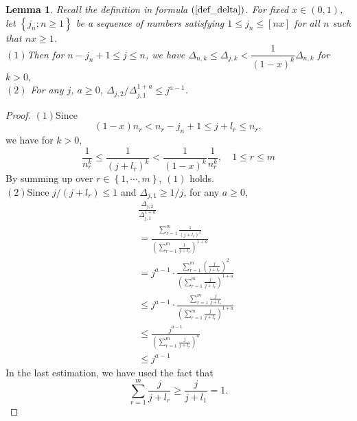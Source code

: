 \documentclass[12pt]{article}
\theoremstyle{plain}
\newtheorem{lem}{\textbf{Lemma}}
\theoremstyle{definition}
\theoremstyle{remark}
\begin{document}
\begin{lem}
	Recall the definition in formula $(\ref{def_delta})$. For fixed $x\in (0,1)$, let $\left\{j_{n} ; n \geq 1\right\}$ be a sequence of numbers satisfying $1\leq j_n\leq [nx]$ for all $n$ such that $nx\geq 1$. \\
	$(1)$Then for $n-j_n +1\leq j \leq n$, we have $\Delta_{n, k} \leq \Delta_{j, k}<\dfrac{1}{(1-x)^{k}} \Delta_{n, k}$ for $k>0$,\\
	$(2)$ For any $j$, $a\geq 0$, $\Delta_{j, 2} / \Delta_{j, 1}^{1+a} \leq j^{a-1}$.
\end{lem}
\begin{proof}
	$(1)$Since 
	\begin{equation*}
		(1-x)n_r< n_{r}-j_{n}+1 \leq j+l_{r} \leq n_{r},
	\end{equation*}
	we have for $k>0$,
	\begin{equation*}
		\frac{1}{n_{r}^{k}} \leq \frac{1}{\left(j+l_{r}\right)^{k}}<\frac{1}{(1-x)^k}\frac{1}{ n_{r}^{k}}, \quad 1 \leq r \leq m
	\end{equation*}
	By summing up over $r \in\left\{1, \cdots, m\right\}$, $(1)$ holds.\\
	$(2)$Since $j /\left(j+l_{r}\right) \leq 1$ and $\Delta_{j,1} \geq 1 / j$, for any $a\geq 0$,
	\begin{eqnarray*}
		&&\frac{\Delta_{j, 2}}{\Delta_{j, 1}^{1+a}}\\
		&&=\frac{\sum_{r=1}^{m} \frac{1}{\left(j+l_{r}\right)^{2}}}{\left(\sum_{r=1}^{m} \frac{1}{j+l_{r}}\right)^{1+a}}\\
		&&=j^{a-1} \cdot \frac{\sum_{r=1}^{m}\left(\frac{j}{j+l_{r}}\right)^{2}}{\left(\sum_{r=1}^{m} \frac{j}{j+l_{r}}\right)^{1+a}} \\
		&&\leq j^{a-1} \cdot \frac{\sum_{r=1}^{m} \frac{j}{j+l_{r}}}{\left(\sum_{r=1}^{m} \frac{j}{j+l_{r}}\right)^{1+a}} \\
		&&\leq \frac{j^{a-1}}{\left(\sum_{r=1}^{m} \frac{j}{j+l_{r}}\right)^{a}} \\
		&&\leq j^{a-1}
	\end{eqnarray*}
	In the last estimation, we have used the fact that 
	\begin{equation*}
		\sum_{r=1}^{m} \frac{j}{j+l_{r}} \geq \frac{j}{j+l_{1}}=1.
	\end{equation*}
\end{proof}
\end{document}
